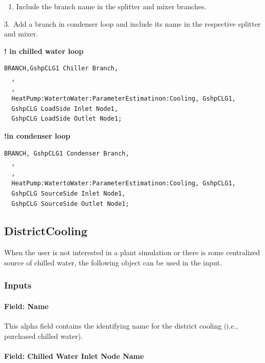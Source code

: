 \begin{enumerate}
    \def\labelenumi{\arabic{enumi}.}
    \setcounter{enumi}{1}
    \tightlist
    \item
    Include the branch name in the splitter and mixer branches.
\end{enumerate}

3.~Add a branch in condenser loop and include its name in the respective splitter and mixer.

\textbf{! in chilled water loop}

\begin{lstlisting}
BRANCH,GshpCLG1 Chiller Branch,
  ,
  ,
  HeatPump:WatertoWater:ParameterEstimatinon:Cooling, GshpCLG1,
  GshpCLG LoadSide Inlet Node1,
  GshpCLG LoadSide Outlet Node1;
\end{lstlisting}

\textbf{!in condenser loop}

\begin{lstlisting}
BRANCH, GshpCLG1 Condenser Branch,
  ,
  ,
  HeatPump:WatertoWater:ParameterEstimatinon:Cooling, GshpCLG1,
  GshpCLG SourceSide Inlet Node1,
  GshpCLG SourceSide Outlet Node1;
\end{lstlisting}

\subsection{DistrictCooling}\label{districtcooling}

When the user is not interested in a plant simulation or there is some centralized source of chilled water, the following object can be used in the input.

\subsubsection{Inputs}\label{inputs-16-008}

\paragraph{Field: Name}\label{field-name-15-006}

This alpha field contains the identifying name for the district cooling (i.e., purchased chilled water).

\paragraph{Field: Chilled Water Inlet Node Name}\label{field-chilled-water-inlet-node-name-9}

